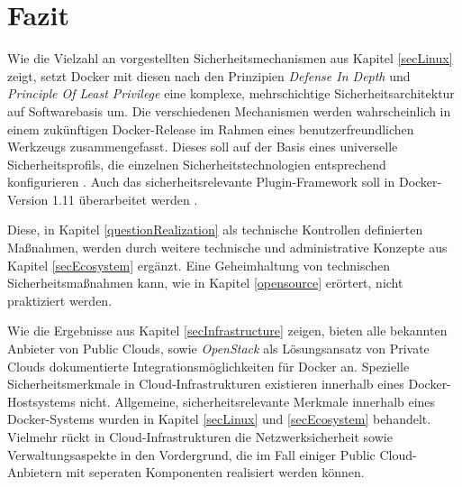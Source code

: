 \documentclass[../main.tex]{subfiles}
\begin{document}
\chapter{Fazit}
\label{result}

  Wie die Vielzahl an vorgestellten Sicherheitsmechanismen aus Kapitel \ref{secLinux} zeigt, setzt Docker mit diesen nach den Prinzipien \emph{Defense In Depth} und \emph{Principle Of Least Privilege} eine komplexe, mehrschichtige Sicherheitsarchitektur auf Softwarebasis um. Die verschiedenen Mechanismen werden wahrscheinlich in einem zukünftigen Docker-Release im Rahmen eines benutzerfreundlichen Werkzeugs zusammengefasst. Dieses soll auf der Basis eines universelle Sicherheitsprofils, die einzelnen Sicherheitstechnologien entsprechend konfigurieren \cite{githubGeneralSecProfiles}. Auch das sicherheitsrelevante Plugin-Framework soll in Docker-Version 1.11 überarbeitet werden \cite{githubDockerRoadmap}\cite{https://github.com/docker/docker/pull/15365}.


  Diese, in Kapitel \ref{questionRealization} als technische Kontrollen definierten Maßnahmen, werden durch weitere technische und administrative Konzepte aus Kapitel \ref{secEcosystem} ergänzt. Eine Geheimhaltung von technischen Sicherheitsmaßnahmen kann, wie in Kapitel \ref{opensource} erörtert, nicht praktiziert werden.

  Wie die Ergebnisse aus Kapitel \ref{secInfrastructure} zeigen, bieten alle bekannten Anbieter von Public Clouds, sowie \emph{OpenStack} als Lösungsansatz von Private Clouds dokumentierte Integrationsmöglichkeiten für Docker an. Spezielle Sicherheitsmerkmale in Cloud-Infrastrukturen existieren innerhalb eines Docker-Hostsystems nicht. Allgemeine, sicherheitsrelevante Merkmale innerhalb eines Docker-Systems wurden in Kapitel \ref{secLinux} und \ref{secEcosystem} behandelt. Vielmehr rückt in Cloud-Infrastrukturen die Netzwerksicherheit sowie Verwaltungsaspekte in den Vordergrund, die im Fall einiger Public Cloud-Anbietern mit seperaten Komponenten realisiert werden können.
\end{document}
